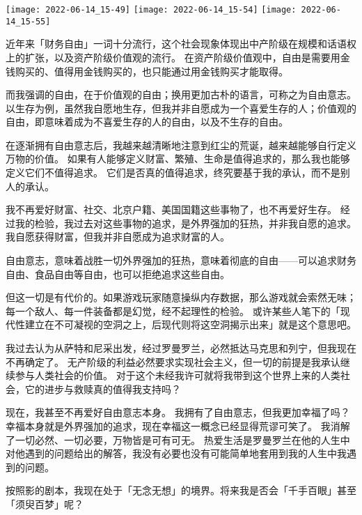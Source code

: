 




\noindent\begin{minipage}{\linewidth}
    \center\noindent
    \texttt{[image: 2022-06-14\_15-49]}%
    \texttt{[image: 2022-06-14\_15-54]}%
    \texttt{[image: 2022-06-14\_15-55]}%
\end{minipage}

近年来「财务自由」一词十分流行，这个社会现象体现出中产阶级在规模和话语权上的扩张，以及资产阶级价值观的流行。
在资产阶级价值观中，自由是需要用金钱购买的、值得用金钱购买的，也只能通过用金钱购买才能取得。
\clearpage

而我强调的自由，在于价值观的自由；换用更加古朴的语言，可称之为自由意志。
以生存为例，虽然我自愿地生存，但我并非自愿成为一个喜爱生存的人；价值观的自由，即意味着成为不喜爱生存的人的自由，以及不生存的自由。
\clearpage

在逐渐拥有自由意志后，我越来越清晰地注意到红尘的荒诞，越来越能够自行定义万物的价值。
如果有人能够定义财富、繁殖、生命是值得追求的，那么我也能够定义它们不值得追求。
它们是否真的值得追求，终究要基于我的承认，而不是别人的承认。
\clearpage

我不再爱好财富、社交、北京户籍、美国国籍这些事物了，也不再爱好生存。
经过我的检验，我过去对这些事物的追求，是外界强加的狂热，并非我自愿的追求。
我自愿获得财富，但我并非自愿成为追求财富的人。

自由意志，意味着战胜一切外界强加的狂热，意味着彻底的自由——可以追求财务自由、食品自由等自由，也可以拒绝追求这些自由。

但这一切是有代价的。如果游戏玩家随意操纵内存数据，那么游戏就会索然无味；每一个敌人、每一件装备都是幻觉，经不起理性的检验。
或许某些人笔下的「现代性建立在不可凝视的空洞之上，后现代则将这空洞揭示出来」就是这个意思吧。
\clearpage

我过去认为从萨特和尼采出发，经过罗曼罗兰，必然抵达马克思和列宁，但我现在不再确定了。
无产阶级的利益必然要求实现社会主义，但一切的前提是我承认继续参与人类社会的价值。
对于这个未经我许可就将我带到这个世界上来的人类社会，它的进步与救赎真的值得我支持吗？
\clearpage

现在，我甚至不再爱好自由意志本身。
我拥有了自由意志，但我更加幸福了吗？幸福本身就是外界强加的追求，现在幸福这一概念已经显得荒谬可笑了。
我消解了一切必然、一切必要，万物皆是可有可无。
热爱生活是罗曼罗兰在他的人生中对他遇到的问题给出的解答，我没有必要也没有可能简单地套用到我的人生中我遇到的问题。
\clearpage

按照影的剧本，我现在处于「无念无想」的境界。将来我是否会「千手百眼」甚至「须臾百梦」呢？



